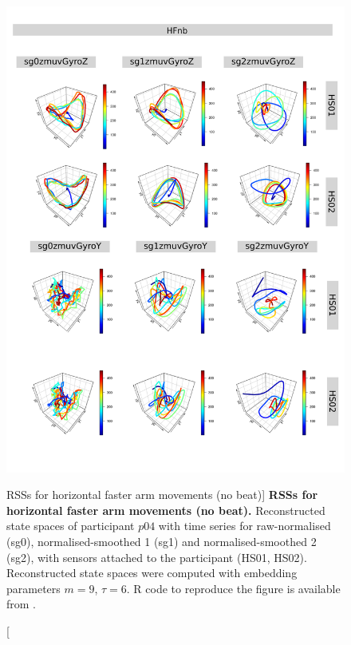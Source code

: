 \begin{figure}
\centering
\includegraphics[height=0.8\textheight]{rss_HFnb_p04}
\caption
	[RSSs for horizontal faster arm movements (no beat)]{
	{\bf RSSs for horizontal faster arm movements (no beat).}
	Reconstructed state spaces of participant $p04$
	with time series for raw-normalised (sg0), 
	normalised-smoothed 1 (sg1) and 
	normalised-smoothed 2 (sg2), 
	with sensors attached to the participant (HS01, HS02).
	Reconstructed state spaces were computed with 
	embedding parameters $m=9$, $\tau=6$.
	R code to reproduce the figure is available from \cite{xochicale2018}.
        }
     \label{fig:rss_HFnb_p04}
\end{figure}



